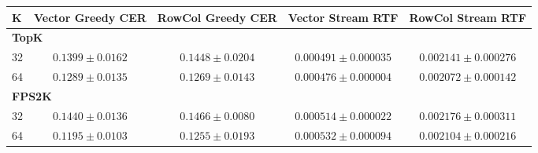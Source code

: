 \begin{tabular}{lcccc}
\toprule
K & Vector Greedy CER & RowCol Greedy CER & Vector Stream RTF & RowCol Stream RTF \\
\midrule
\midrule
\multicolumn{5}{l}{\textbf{TopK}} \\
32 & $0.1399\pm0.0162$ & $0.1448\pm0.0204$ & $0.000491\pm0.000035$ & $0.002141\pm0.000276$ \\
64 & $0.1289\pm0.0135$ & $0.1269\pm0.0143$ & $0.000476\pm0.000004$ & $0.002072\pm0.000142$ \\
\midrule
\multicolumn{5}{l}{\textbf{FPS2K}} \\
32 & $0.1440\pm0.0136$ & $0.1466\pm0.0080$ & $0.000514\pm0.000022$ & $0.002176\pm0.000311$ \\
64 & $0.1195\pm0.0103$ & $0.1255\pm0.0193$ & $0.000532\pm0.000094$ & $0.002104\pm0.000216$ \\
\bottomrule
\end{tabular}
